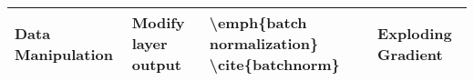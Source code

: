 \begin{table*}[h!]
\begin{tabular}{@{}llll@{}}
Data Manipulation              & Modify layer output                                                & \textbackslash{}emph\{batch normalization\} \textbackslash{}cite\{batchnorm\}                                                                                                                                                                              & Exploding Gradient                                                             \\ \bottomrule
\end{tabular}
\end{table*}
